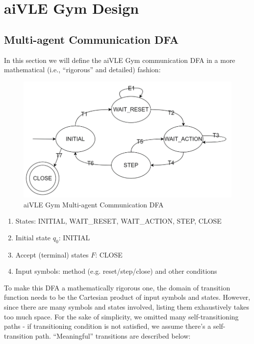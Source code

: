 \chapter{aiVLE Gym Design}
\label{appendix:aivle-gym}
\section{Multi-agent Communication DFA}
\label{as:aivle-gym_dfa}

In this section we will define the aiVLE Gym communication DFA in a more mathematical (i.e., ``rigorous'' and detailed) fashion:

\begin{figure}[H]
    \centering
    \includegraphics{images/aivle-gym-multi-dfa.png}
    \caption{aiVLE Gym Multi-agent Communication DFA}
    \label{fig:aivle-gym_dfa}
\end{figure}

\begin{enumerate}
    \item States: INITIAL, WAIT\_RESET, WAIT\_ACTION, STEP, CLOSE
    \item Initial state $q_0$: INITIAL
    \item Accept (terminal) states $F$: CLOSE
    \item Input symbols: method (e.g. reset/step/close) and other conditions
\end{enumerate}

To make this DFA a mathematically rigorous one, the domain of transition function needs to be the Cartesian product of input symbols and states. However, since there are many symbols and states involved, listing them exhaustively takes too much space. For the sake of simplicity, we omitted many self-transitioning paths - if transitioning condition is not satisfied, we assume there's a self-transition path. ``Meaningful'' transitions are described below:

